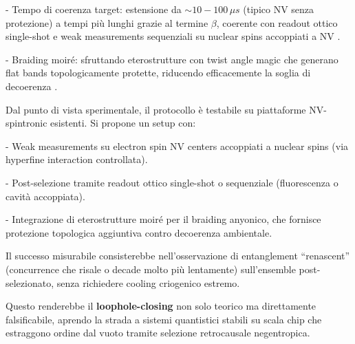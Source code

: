 \documentclass[11pt,a4paper]{article}
\let\oldcite\cite
\renewcommand{\cite}{\protect\oldcite}
\theoremstyle{plain}
\theoremstyle{definition}
\begin{document}
\vspace{0.4cm}



- Tempo di coerenza target: estensione da \(\sim 10-100\,\mu s\) (tipico NV senza protezione) a tempi più lunghi grazie al termine \(\beta\), coerente con readout ottico single-shot e weak measurements sequenziali su nuclear spins accoppiati a NV \cite{pfender2019}.


\vspace{0.4cm}



- Braiding moiré: sfruttando eterostrutture con twist angle magic che generano flat bands topologicamente protette, riducendo efficacemente la soglia di decoerenza \cite{crepel2025}.


\vspace{0.5cm}

Dal punto di vista sperimentale, il protocollo è testabile su piattaforme NV-spintronic esistenti. Si propone un setup con:

\vspace{0.2cm}

- Weak measurements su electron spin NV centers accoppiati a nuclear spins (via hyperfine interaction controllata).

\vspace{0.2cm}


- Post-selezione tramite readout ottico single-shot o sequenziale (fluorescenza o cavità accoppiata).


\vspace{0.2cm}



- Integrazione di eterostrutture moiré per il braiding anyonico, che fornisce protezione topologica aggiuntiva contro decoerenza ambientale.

\vspace{0.4cm}

Il successo misurabile consisterebbe nell'osservazione di entanglement ``renascent'' (concurrence che risale o decade molto più lentamente) sull'ensemble post-selezionato, senza richiedere cooling criogenico estremo. 


\vspace{0.4cm}



Questo renderebbe il \textbf{loophole-closing} non solo teorico ma direttamente falsificabile, aprendo la strada a sistemi quantistici stabili su scala chip che estraggono ordine dal vuoto tramite selezione retrocausale negentropica.
\end{document}
